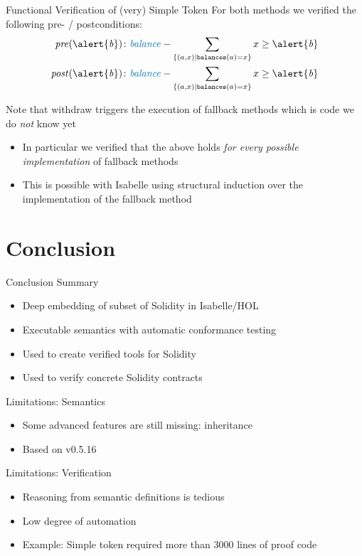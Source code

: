 \documentclass[aspectratio=169]{beamer}
\begin{document}
\begin{frame}{Functional Verification of (very) Simple Token}
	For both methods we verified the following pre- / postconditions:
	\begin{align*}
		\mathit{pre(\alert{b})}\colon&\mathit{\color{blue}balance}-\sum_{\{(a,x)|\texttt{balances}(a)=x\}} x \geq \mathit{\alert{b}}\\
		\mathit{post(\alert{b})}\colon&\mathit{\color{blue}balance}-\sum_{\{(a,x)|\texttt{balances}(a)=x\}} x \geq \mathit{\alert{b}}
	\end{align*}
\pause

	Note that withdraw triggers the execution of fallback methods which is code we do \emph{not} know yet
	\begin{itemize}
		\item In particular we verified that the above holds \emph{for every possible implementation} of fallback methods
		\item This is possible with Isabelle using structural induction over the implementation of the fallback method
	\end{itemize}
\end{frame}

\section{Conclusion}
\frame{\tableofcontents[currentsection]}

\begin{frame}{Conclusion}
Summary
\begin{itemize}
	\item Deep embedding of subset of Solidity in Isabelle/HOL
	\item Executable semantics with automatic conformance testing
	\item Used to create verified tools for Solidity
	\item Used to verify concrete Solidity contracts
\end{itemize}
\bigskip\pause

Limitations: Semantics
\begin{itemize}
	\item Some advanced features are still missing: inheritance
	\item Based on v0.5.16
\end{itemize}
\bigskip\pause

Limitations: Verification
\begin{itemize}
	\item Reasoning from semantic definitions is tedious
	\item Low degree of automation
	\item Example: Simple token required more than $3000$ lines of proof code
\end{itemize}
\end{frame}
\end{document}

